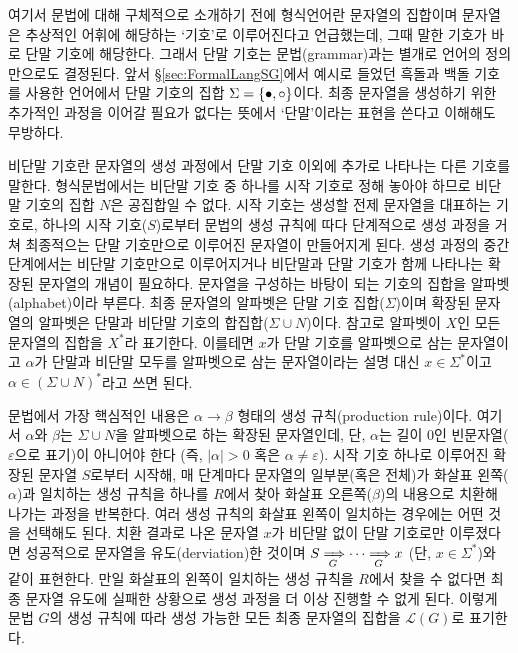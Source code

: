 여기서 문법에 대해 구체적으로 소개하기 전에 형식언어란 문자열의 집합이며
문자열은 추상적인 어휘에 해당하는 `기호'로 이루어진다고 언급했는데,
그때 말한 기호가 바로 단말 기호에 해당한다.
그래서 단말 기호는 문법(grammar)과는 별개로 언어의 정의만으로도 결정된다.
앞서 \S\ref{sec:FormalLangSG}에서 예시로 들었던 흑돌과 백돌 기호를 사용한
언어에서 단말 기호의 집합 $\Sigma = \{\bullet, \circ\}$이다.
최종 문자열을 생성하기 위한 추가적인 과정을 이어갈 필요가 없다는 뜻에서
`단말'이라는 표현을 쓴다고 이해해도 무방하다.

비단말 기호란 문자열의 생성 과정에서 단말 기호 이외에 추가로 나타나는
다른 기호를 말한다. 형식문법에서는 비단말 기호 중 하나를 시작 기호로
정해 놓아야 하므로 비단말 기호의 집합 $N$은 공집합일 수 없다. 시작 기호는
생성할 전제 문자열을 대표하는 기호로, 하나의 시작 기호($S$)로부터 문법의
생성 규칙에 따다 단계적으로 생성 과정을 거쳐 최종적으는 단말 기호만으로
이루어진 문자열이 만들어지게 된다. 생성 과정의 중간 단계에서는 비단말 기호만으로
이루어지거나 비단말과 단말 기호가 함께 나타나는 확장된 문자열의 개념이 필요하다.
문자열을 구성하는 바탕이 되는 기호의 집합을 알파벳(alphabet)이라 부른다.
최종 문자열의 알파벳은 단말 기호 집합($\Sigma$)이며 확장된 문자열의 알파벳은
단말과 비단말 기호의 합집합($\Sigma\cup N$)이다. 참고로 알파벳이 $X$인
모든 문자열의 집합을 $X^{*}$라 표기한다. 이를테면
$x$가 단말 기호를 알파벳으로 삼는 문자열이고
$\alpha$가 단말과 비단말 모두를 알파벳으로 삼는 문자열이라는
설명 대신 $x\in\Sigma^{*}$이고 $\alpha\in(\Sigma\cup N)^{*}$라고 쓰면 된다.

문법에서 가장 핵심적인 내용은 $\alpha\to\beta$ 형태의 생성 규칙(production rule)이다.
여기서 $\alpha$와 $\beta$는  $\Sigma\cup N$을 알파벳으로 하는 확장된 문자열인데,
단, $\alpha$는 길이 0인 빈문자열($\varepsilon$으로 표기)이 아니어야 한다
(즉, $\lvert\alpha\rvert>0$ 혹은 $\alpha\neq\varepsilon$).
시작 기호 하나로 이루어진 확장된 문자열 $S$로부터 시작해, 매 단계마다
문자열의 일부분(혹은 전체)가 화살표 왼쪽($\alpha$)과 일치하는 생성 규칙을
하나를 $R$에서 찾아 화살표 오른쪽($\beta$)의 내용으로 치환해 나가는 과정을
반복한다. 여러 생성 규칙의 화살표 왼쪽이 일치하는 경우에는 어떤 것을 선택해도 된다.
치환 결과로 나온 문자열 $x$가 비단말 없이 단말 기호로만 이루졌다면
성공적으로 문자열을 유도(derviation)한 것이며
$S\xRightarrow[\,G]{} \cdots \xRightarrow[\,G]{} x$ (단, $x\in\Sigma^{*}$)와 같이 표현한다.
만일 화살표의 왼쪽이 일치하는 생성 규칙을 $R$에서 찾을 수 없다면
최종 문자열 유도에 실패한 상황으로 생성 과정을 더 이상 진행할 수 없게 된다.
이렇게 문법 $G$의 생성 규칙에 따라 생성 가능한 모든 최종 문자열의 집합을
$\mathcal{L}(G)$로 표기한다.


